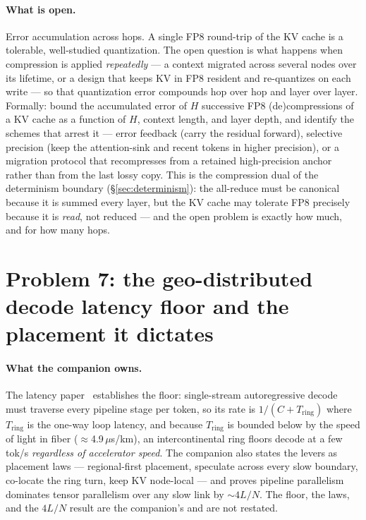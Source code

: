 \documentclass[11pt]{article}
\newcommand{\Tring}{\ensuremath{T_{\mathrm{ring}}}}
\begin{document}
\paragraph{What is open.} Error accumulation across hops. A single FP8 round-trip of the KV cache is a
tolerable, well-studied quantization. The open question is what happens when compression is applied
\emph{repeatedly} --- a context migrated across several nodes over its lifetime, or a design that keeps KV
in FP8 resident and re-quantizes on each write --- so that quantization error compounds hop over hop and
layer over layer. Formally: bound the accumulated error of $H$ successive FP8 (de)compressions of a KV
cache as a function of $H$, context length, and layer depth, and identify the schemes that arrest it ---
error feedback (carry the residual forward), selective precision (keep the attention-sink and recent tokens
in higher precision), or a migration protocol that recompresses from a retained high-precision anchor
rather than from the last lossy copy. This is the compression dual of the determinism boundary
(\S\ref{sec:determinism}): the all-reduce must be canonical  because it is summed every layer,
but the KV cache may tolerate FP8 precisely because it is \emph{read}, not reduced --- and the open problem
is exactly how much, and for how many hops.

\section{Problem 7: the geo-distributed decode latency floor and the placement it dictates}
\label{sec:geofloor}

\paragraph{What the companion owns.} The latency paper~\cite{latency} establishes the floor: single-stream
autoregressive decode must traverse every pipeline stage per token, so its rate is $1/(C+\Tring)$ where
$\Tring$ is the one-way loop latency, and because $\Tring$ is bounded below by the speed of light in fiber
($\approx$4.9\,$\mu$s/km), an intercontinental ring floors decode at a few tok/s \emph{regardless of
accelerator speed}. The companion also states the levers as placement laws --- regional-first placement,
speculate across every slow boundary, co-locate the ring turn, keep KV node-local --- and proves pipeline
parallelism dominates tensor parallelism over any slow link by $\sim\!4L/N$. The floor, the laws, and the
$4L/N$ result are the companion's and are not restated.
\end{document}
